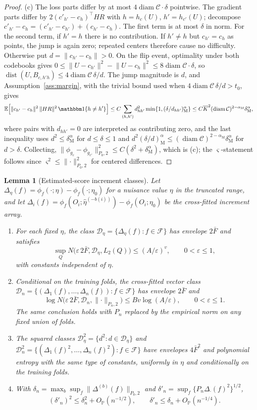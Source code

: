 \documentclass[11pt]{article}
\newtheorem{lemma}{Lemma}
\newcommand{\E}{\mathbb E}
\newcommand{\Pp}{\mathbb P}
\newcommand{\ind}[1]{\mathbbm 1\{#1\}}
\newcommand{\Op}{O_{\Pp}}
\newcommand{\dist}{\operatorname{dist}}
\newcommand{\diam}{\operatorname{diam}}
\newcommand{\calC}{\mathcal C}
\newcommand{\calD}{\mathcal D}
\newcommand{\calF}{\mathcal F}
\newcommand{\hateta}{\widehat\eta}
\newcommand{\eps}{\varepsilon}
\newcommand{\norm}[1]{\lVert #1\rVert}
\newcommand{\am}{\alpha_{\mathrm M}}
\begin{document}
\begin{proof}
(c) The loss parts differ by at most $4\diam\calC\cdot\delta$ pointwise. The gradient parts differ by $2(c'_{h'}-c_h)^\top HR$ with $h=h_c(U)$, $h'=h_{c'}(U)$; decompose $c'_{h'}-c_h=(c'_{h'}-c_{h'})+(c_{h'}-c_h)$. The first term is at most $\delta$ in norm. For the second term, if $h'=h$ there is no contribution. If $h'\ne h$ but $c_{h'}=c_h$ as points, the jump is again zero; repeated centers therefore cause no difficulty. Otherwise put $d=\norm{c_{h'}-c_h}>0$. On the flip event, optimality under both codebooks gives
$0\le\norm{U-c_{h'}}^2-\norm{U-c_h}^2\le8\diam\calC\cdot\delta$,
so $\dist(U,B_{c,h'h})\le4\diam\calC\,\delta/d$. The jump magnitude is $d$, and Assumption~\ref{ass:margin}, with the trivial bound used when $4\diam\calC\,\delta/d>t_0$, gives
\begin{equation*}
\E\Bigl[\norm{c_{h'}-c_h}^2\,\norm{HR}^2\,\ind{h\ne h'}\Bigr]
\le C\sum_{(h,h')} d_{hh'}^2\min\{1,(\delta/d_{hh'})^\am \}
\le C\overline K^2(\diam\calC)^{2-\am}\delta^\am,
\end{equation*}
where pairs with $d_{hh'}=0$ are interpreted as contributing zero, and the last inequality uses $d^2\le\delta^\am$ for $d\le\delta\le1$ and $d^2(\delta/d)^\am\le(\diam\calC)^{2-\am}\delta^\am$ for $d>\delta$. Collecting, $\norm{\phi_{g_c}-\phi_{g_{c'}}}_{P_0,2}^2\le C(\delta^2+\delta^\am)$, which is (c); the $\varsigma$-statement follows since $\varsigma^2\le\norm{\cdot}_{P_0,2}^2$ for centered differences.
\end{proof}


\begin{lemma}[Estimated-score increment classes]\label{lem:incrementclass}
Let $\Delta_\eta(f)=\phi_f(\cdot;\eta)-\phi_f(\cdot;\eta_0)$ for a nuisance value $\eta$ in the truncated range, and let $\Delta_i(f)=\phi_f(O_i;\hateta^{(-b(i))})-\phi_f(O_i;\eta_0)$ be the cross-fitted increment array.
\begin{enumerate}[label=(\alph*),leftmargin=2em]
\item For each fixed $\eta$, the class $\calD_\eta=\{\Delta_\eta(f):f\in\calF\}$ has envelope $2\bar F$ and satisfies
\[
\sup_Q N\bigl(\eps\,2\bar F,\calD_\eta,L_2(Q)\bigr)\le(A/\eps)^v,
\qquad 0<\eps\le1,
\]
with constants independent of $\eta$.
\item Conditional on the training folds, the cross-fitted vector class
$\calD_n=\{(\Delta_1(f),\ldots,\Delta_n(f)):f\in\calF\}$ has envelope $2\bar F$ and
\[
\log N\bigl(\eps\,2\bar F,\calD_n,\norm{\cdot}_{P_n,2}\bigr)\le Bv\log(A/\eps),
\qquad 0<\eps\le1.
\]
The same conclusion holds with $P_n$ replaced by the empirical norm on any fixed union of folds.
\item The squared classes $\calD_\eta^2=\{d^2:d\in\calD_\eta\}$ and $\calD_n^2=\{(\Delta_1(f)^2,\ldots,\Delta_n(f)^2):f\in\calF\}$ have envelopes $4\bar F^2$ and polynomial entropy with the same type of constants, uniformly in $\eta$ and conditionally on the training folds.
\item With $\delta_n=\max_b\sup_f\norm{\Delta^{(b)}(f)}_{P_0,2}$ and $\delta'_n=\sup_f\{P_n\Delta_\cdot(f)^2\}^{1/2}$,
\[
(\delta'_n)^2\le\delta_n^2+\Op(n^{-1/2}),
\qquad
\delta'_n\le\delta_n+\Op(n^{-1/4}).
\]
\end{enumerate}
\end{lemma}
\end{document}

